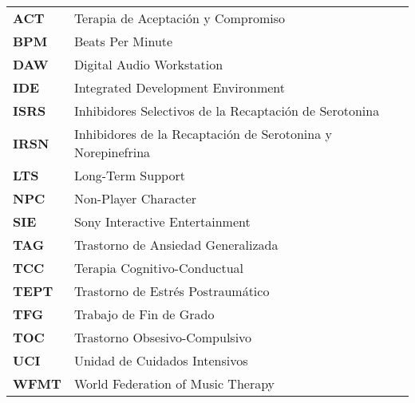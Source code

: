 
\renewcommand{\arraystretch}{1.5}



\begin{longtable}{l p{13.7cm}}

\textbf{ACT} & Terapia de Aceptación y Compromiso \\	
\textbf{BPM} & Beats Per Minute \\
\textbf{DAW} & Digital Audio Workstation \\
\textbf{IDE} & Integrated Development Environment \\
\textbf{ISRS} & Inhibidores Selectivos de la Recaptación de Serotonina \\
\textbf{IRSN} & Inhibidores de la Recaptación de Serotonina y Norepinefrina \\
\textbf{LTS} & Long-Term Support \\
\textbf{NPC} & Non-Player Character \\
\textbf{SIE} & Sony Interactive Entertainment \\
\textbf{TAG} & Trastorno de Ansiedad Generalizada \\
\textbf{TCC} & Terapia Cognitivo-Conductual \\
\textbf{TEPT} & Trastorno de Estrés Postraumático \\
\textbf{TFG} & Trabajo de Fin de Grado \\
\textbf{TOC} & Trastorno Obsesivo-Compulsivo \\
\textbf{UCI} & Unidad de Cuidados Intensivos \\
\textbf{WFMT} & World Federation of Music Therapy \\

\end{longtable}

